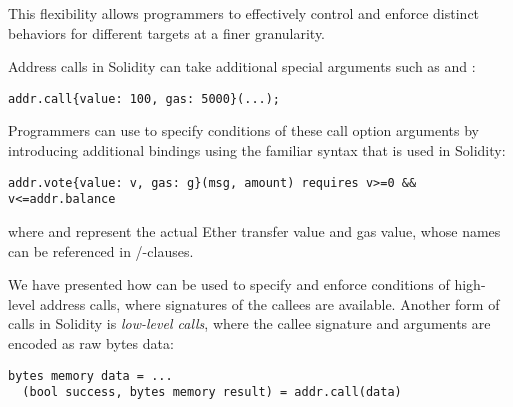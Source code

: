 This flexibility allows programmers to effectively 
control and enforce distinct behaviors for different targets at a finer granularity.



Address calls in Solidity can 
take additional special arguments
such as  and :
\begin{lstlisting}
addr.call{value: 100, gas: 5000}(...);
\end{lstlisting}
Programmers can use \lang to specify conditions of these call option arguments 
by introducing additional bindings using the familiar syntax that is used in Solidity:
\begin{lstlisting}[language=Consol]
addr.vote{value: v, gas: g}(msg, amount) requires v>=0 && v<=addr.balance
\end{lstlisting}
where  and  represent the actual Ether transfer value and gas value, 
whose names can be referenced in /-clauses.

We have presented how \lang can be used to specify and enforce
conditions of high-level address calls, where signatures
of the callees are available.
Another form of calls in Solidity is \emph{low-level calls},
where the callee signature and arguments are encoded as raw bytes data:
\begin{lstlisting}[language=Solidity]
  bytes memory data = ...
  (bool success, bytes memory result) = addr.call(data)
\end{lstlisting}

